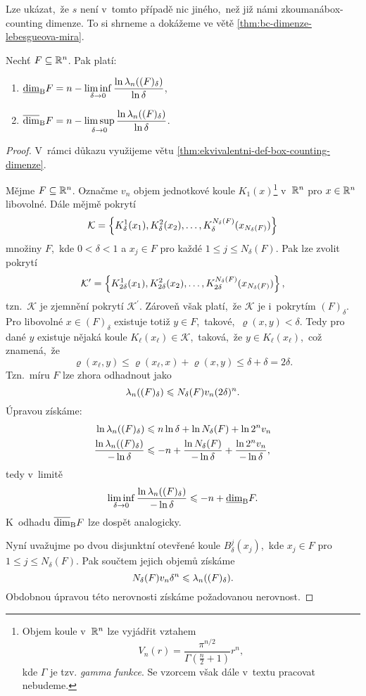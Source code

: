 Lze ukázat,~že $s$ není v~tomto případě nic jiného,~než již námi zkoumaná\linebreak{}box-counting dimenze. To si shrneme a dokážeme ve větě \ref{thm:bc-dimenze-lebesgueova-mira}.
\begin{theorem}\label{thm:bc-dimenze-lebesgueova-mira}
    Nechť $F\subseteq\mathbb{R}^n$. Pak platí: 
    \begin{enumerate}[label=(\roman*)]
        \item $\underline{\dim}_\textup{B}{F}=n-\liminf\limits_{\delta\to 0}\dfrac{\ln{\ensuremath{\lambda_n}((F)_\delta)}}{\ln{\delta}}$,
        \item $\overline{\dim}_\textup{B}{F}=n-\limsup\limits_{\delta\to 0}\dfrac{\ln{\ensuremath{\lambda_n}((F)_\delta)}}{\ln{\delta}}$.
    \end{enumerate}
\end{theorem}
\begin{proof}
    V~rámci důkazu využijeme větu \ref{thm:ekvivalentni-def-box-counting-dimenze}.

    Mějme $F\subseteq\mathbb{R}^n$. Označme $v_n$ objem jednotkové koule $K_1(x)$\footnote{Objem koule v~$\mathbb{R}^n$ lze vyjádřit vztahem
    \[V_n(r)=\dfrac{\pi^{n/2}}{\Gamma\left(\frac{n}{2}+1\right)}r^n,\]
    kde $\Gamma$ je tzv. \emph{gamma funkce}. Se vzorcem však dále v~textu pracovat nebudeme.
    } v~$\mathbb{R}^n$ pro $x\in\mathbb{R}^n$ libovolné. Dále mějmě pokrytí
    \[\mathcal{K}=\left\{K_\delta^1(x_1),K_\delta^2(x_2),\ldots,K_\delta^{N_\delta(F)}(x_{N_\delta(F)})\right\}\]
    množiny $F$,~kde $0<\delta<1$ a $x_j\in F$ pro každé $1\leqslant j\leqslant N_\delta(F)$. Pak lze zvolit pokrytí
    \[\mathcal{K}^\prime=\left\{K_{2\delta}^1(x_1),K_{2\delta}^2(x_2),\ldots,K_{2\delta}^{N_\delta(F)}(x_{N_\delta(F)})\right\},\]
    tzn.~$\mathcal{K}$ je zjemnění pokrytí $\mathcal{K}^\prime$. Zároveň však platí,~že $\mathcal{K}$ je i~pokrytím $(F)_\delta$. Pro libovolné $x\in (F)_\delta$ existuje totiž $y\in F$,~takové,~$\varrho(x,y)<\delta$. Tedy pro dané $y$ existuje nějaká koule $K_\ell(x_\ell)\in\mathcal{K}$,~taková,~že $y\in K_\ell(x_\ell)$,~což znamená,~že
    \[\varrho(x_\ell,y)\leqslant\varrho(x_\ell,x)+\varrho(x,y)\leqslant\delta+\delta=2\delta.\]
    Tzn.~míru $F$ lze zhora odhadnout jako
    \[\lambda_n((F)_\delta)\leqslant N_\delta(F)v_n(2\delta)^n.\]
    Úpravou získáme:
    \begin{align*}
        \ln{\ensuremath{\lambda_n}((F)_\delta)}&\leqslant n\ln{\delta}+\ln{N_\delta(F)}+\ln{2^nv_n}\\
        \dfrac{\ln{\ensuremath{\lambda_n}((F)_\delta)}}{-\ln\delta}&\leqslant -n+\dfrac{\ln{N_\delta(F)}}{-\ln\delta}+\dfrac{\ln{2^nv_n}}{-\ln\delta},
    \end{align*}
    tedy v~limitě
    \[\liminf_{\delta\to 0}\dfrac{\ln\lambda_n((F)_\delta)}{-\ln\delta}\leqslant -n+\underline{\dim}_\textup{B}{F}.\]
    K~odhadu $\overline{\dim}_\textup{B}{F}$ lze dospět analogicky.

    Nyní uvažujme po dvou disjunktní otevřené koule $B_\delta^j(x_j)$,~kde $x_j\in F$ pro $1\leqslant j\leqslant N_\delta(F)$. Pak součtem jejich objemů získáme
    \[N_\delta(F)v_n\delta^n\leqslant\lambda_n((F)_\delta).\]
    Obdobnou úpravou této nerovnosti získáme požadovanou nerovnost.
\end{proof}
